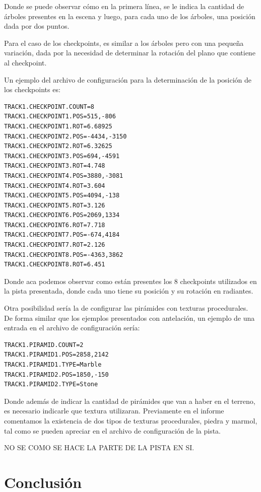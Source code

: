 \documentclass[a4paper,10pt]{article}
\begin{document}
Donde se puede observar cómo en la primera línea, se le indica la cantidad de
árboles presentes en la escena y luego, para cada uno de los árboles, una
posición dada por dos puntos.

Para el caso de los checkpoints, es similar a los árboles pero con una pequeña
variación, dada por la necesidad de determinar la rotación del plano que
contiene al checkpoint.

Un ejemplo del archivo de configuración para la determinación de la posición de
los checkpoints es:

\begin{verbatim}
TRACK1.CHECKPOINT.COUNT=8
TRACK1.CHECKPOINT1.POS=515,-806
TRACK1.CHECKPOINT1.ROT=6.68925
TRACK1.CHECKPOINT2.POS=-4434,-3150
TRACK1.CHECKPOINT2.ROT=6.32625
TRACK1.CHECKPOINT3.POS=694,-4591
TRACK1.CHECKPOINT3.ROT=4.748
TRACK1.CHECKPOINT4.POS=3880,-3081
TRACK1.CHECKPOINT4.ROT=3.604
TRACK1.CHECKPOINT5.POS=4094,-138
TRACK1.CHECKPOINT5.ROT=3.126
TRACK1.CHECKPOINT6.POS=2069,1334
TRACK1.CHECKPOINT6.ROT=7.718
TRACK1.CHECKPOINT7.POS=-674,4184
TRACK1.CHECKPOINT7.ROT=2.126
TRACK1.CHECKPOINT8.POS=-4363,3862
TRACK1.CHECKPOINT8.ROT=6.451
\end{verbatim}

Donde aca podemos observar como están presentes los 8 checkpoints utilizados en
la pista presentada, donde cada uno tiene su posición y su rotación en
radiantes.

Otra posibilidad sería la de configurar las pirámides con texturas
procedurales.  De forma similar que los ejemplos presentados con antelación, un
ejemplo de una entrada en el archivo de configuración sería:

\begin{verbatim}
TRACK1.PIRAMID.COUNT=2
TRACK1.PIRAMID1.POS=2858,2142
TRACK1.PIRAMID1.TYPE=Marble
TRACK1.PIRAMID2.POS=1850,-150
TRACK1.PIRAMID2.TYPE=Stone
\end{verbatim}

Donde además de indicar la cantidad de pirámides que van a haber en el terreno,
es necesario indicarle que textura utilizaran.  Previamente en el informe
comentamos la existencia de dos tipos de texturas procedurales, piedra y
marmol, tal como se pueden apreciar en el archivo de configuración de la pista.

NO SE COMO SE HACE LA PARTE DE LA PISTA EN SI.

\section{Conclusión}
\label{conclusiones}
\end{document}
